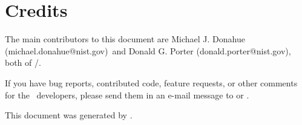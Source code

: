 \chapter*{Credits}\label{sec:credits}


\newcommand{\myCredit}[3]{#1 (#3)}

\newcommand{\CreditMJD}{%
\myCredit{Michael J. Donahue}{mailto:michael.donahue@nist.gov}{michael.donahue@nist.gov}}

\newcommand{\CreditDGP}{%
\myCredit{Donald G. Porter}{mailto:donald.porter@nist.gov}{donald.porter@nist.gov}}

\newcommand{\CreditRDM}{%
\myCredit{Robert D. McMichael}{mailto:rmcmichael@nist.gov}{rmcmichael@nist.gov}}

\newcommand{\CreditJE}{%
\myCredit{Jason Eicke}{mailto:jeicke@seas.gwu.edu}{jeicke@seas.gwu.edu}}

The main contributors to this document are \CreditMJD\ and \CreditDGP,
both of
/.

If you have bug reports, contributed code, feature
requests, or other comments for the \OOMMF\ developers, please send them
in an e-mail message to
{}
or
{}%
.

\begin{latexonly}
  \iflatexml
  This document was generated by \LaTeXML.
  \fi
\end{latexonly}
\begin{htmlonly}
\htmlinfo*
\end{htmlonly}
